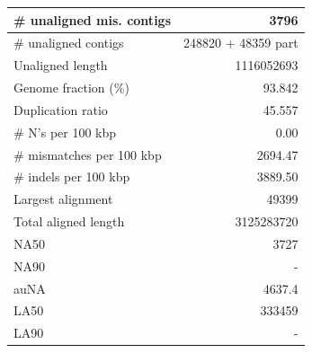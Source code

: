 \documentclass[12pt,a4paper]{article}
\begin{document}
\begin{table}[ht]
\begin{center}
\begin{tabular}{|l*{1}{|r}|}
\# unaligned mis. contigs & 3796 \\ \hline
\# unaligned contigs & 248820 + 48359 part \\ \hline
Unaligned length & 1116052693 \\ \hline
Genome fraction (\%) & 93.842 \\ \hline
Duplication ratio & 45.557 \\ \hline
\# N's per 100 kbp & 0.00 \\ \hline
\# mismatches per 100 kbp & 2694.47 \\ \hline
\# indels per 100 kbp & 3889.50 \\ \hline
Largest alignment & 49399 \\ \hline
Total aligned length & 3125283720 \\ \hline
NA50 & 3727 \\ \hline
NA90 & - \\ \hline
auNA & 4637.4 \\ \hline
LA50 & 333459 \\ \hline
LA90 & - \\ \hline
\end{tabular}
\end{center}
\end{table}
\end{document}
